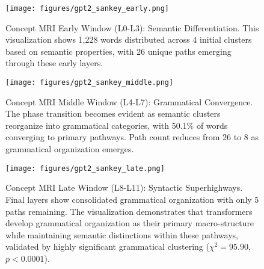 \begin{figure}[ht]
    \centering
    \texttt{[image: figures/gpt2\_sankey\_early.png]}
    \caption{Concept MRI Early Window (L0-L3): Semantic Differentiation. This visualization shows 1,228 words distributed across 4 initial clusters based on semantic properties, with 26 unique paths emerging through these early layers.}
    \label{fig:gpt2_sankey_early}
\end{figure}

\begin{figure}[ht]
    \centering
    \texttt{[image: figures/gpt2\_sankey\_middle.png]}
    \caption{Concept MRI Middle Window (L4-L7): Grammatical Convergence. The phase transition becomes evident as semantic clusters reorganize into grammatical categories, with 50.1\% of words converging to primary pathways. Path count reduces from 26 to 8 as grammatical organization emerges.}
    \label{fig:gpt2_sankey_middle}
\end{figure}

\begin{figure}[ht]
    \centering
    \texttt{[image: figures/gpt2\_sankey\_late.png]}
    \caption{Concept MRI Late Window (L8-L11): Syntactic Superhighways. Final layers show consolidated grammatical organization with only 5 paths remaining. The visualization demonstrates that transformers develop grammatical organization as their primary macro-structure while maintaining semantic distinctions within these pathways, validated by highly significant grammatical clustering ($\chi^2 = 95.90$, $p < 0.0001$).}
    \label{fig:gpt2_sankey_late}
\end{figure}